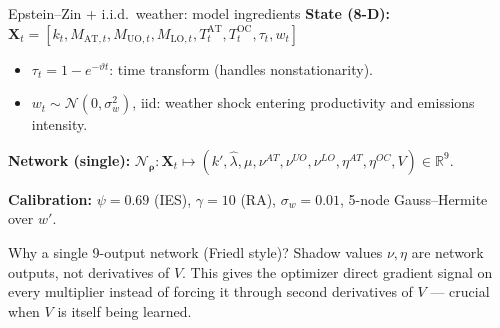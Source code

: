 \documentclass[aspectratio=169,11pt]{beamer}
\newcommand{\emphc}[1]{\textcolor{harvardcrimson}{#1}}
\newcommand{\X}{\bm{X}}
\newcommand{\nn}{\mathcal{N}_{\bm{\rho}}}
\begin{document}
\begin{frame}{Epstein--Zin + i.i.d.\ weather: model ingredients}
\small
\textbf{State (8-D):} $\X_t = [k_t, M_{\mathrm{AT},t}, M_{\mathrm{UO},t}, M_{\mathrm{LO},t}, T^{\mathrm{AT}}_t, T^{\mathrm{OC}}_t, \tau_t, w_t]$
\begin{itemize}\setlength\itemsep{0pt}
    \item $\tau_t = 1 - e^{-\vartheta t}$: time transform (handles nonstationarity).
    \item $w_t \sim \mathcal{N}(0,\sigma_w^2)$, iid: weather shock entering productivity and emissions intensity.
\end{itemize}

\textbf{Network (single):} $\nn : \X_t \mapsto (k', \hat\lambda, \mu, \nu^{\!AT}, \nu^{\!UO}, \nu^{\!LO}, \eta^{\!AT}, \eta^{\!OC}, V) \in \mathbb{R}^9$.

\textbf{Calibration:} $\psi = 0.69$ (IES), $\gamma = 10$ (RA), $\sigma_w = 0.01$, 5-node Gauss--Hermite over $w'$.

\vspace{0.15cm}
\begin{exampleblock}{Why a \emphc{single} 9-output network (Friedl style)?}
Shadow values $\nu, \eta$ are network outputs, not derivatives of $V$. This gives the optimizer direct gradient signal on every multiplier instead of forcing it through second derivatives of $V$ --- crucial when $V$ is itself being learned.
\end{exampleblock}
\end{frame}
\end{document}
